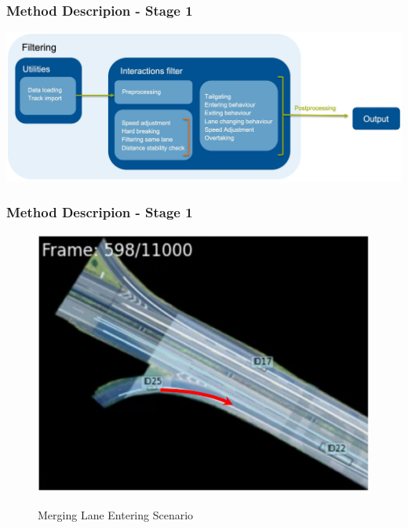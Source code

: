 \begin{frame}
  \frametitle{Method Descripion - Stage 1}
    \includegraphics[width=\textwidth]{figures/pictures_first_part/filtering_overview.jpeg}
\end{frame}


\begin{frame}

  \frametitle{Method Descripion - Stage 1}
  \begin{figure}

    \centering
    \begin{minipage}[b]{0.49\linewidth}
        \includegraphics[width=\textwidth]{figures/pictures_first_part/street_with_arrow.jpeg}

        \centering \footnotesize Merging Lane Entering Scenario
    \end{minipage}
    \begin{minipage}[b]{0.49\linewidth}


\end{minipage}
\end{figure}
\end{frame}
